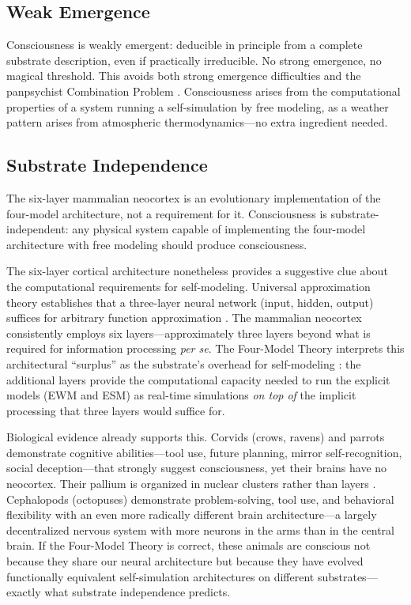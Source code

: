 \documentclass[12pt]{article}
\begin{document}
\subsection{Weak Emergence}

Consciousness is weakly emergent: deducible in principle from a complete substrate description, even if practically irreducible. No strong emergence, no magical threshold. This avoids both strong emergence difficulties \citep{Kim1993} and the panpsychist Combination Problem \citep{Chalmers2016}. Consciousness arises from the computational properties of a system running a self-simulation by free modeling, as a weather pattern arises from atmospheric thermodynamics---\hspace{0pt}no extra ingredient needed.


\subsection{Substrate Independence}

The six-layer mammalian neocortex is an evolutionary implementation of the four-model architecture, not a requirement for it. Consciousness is substrate-independent: any physical system capable of implementing the four-model architecture with free modeling should produce consciousness.

The six-layer cortical architecture nonetheless provides a suggestive clue about the computational requirements for self-modeling. Universal approximation theory establishes that a three-layer neural network (input, hidden, output) suffices for arbitrary function approximation \citep{Cybenko1989,Hornik1989}. The mammalian neocortex consistently employs six layers---\hspace{0pt}approximately three layers beyond what is required for information processing \emph{per se}. The Four-Model Theory interprets this architectural ``surplus'' as the substrate's overhead for self-modeling \citep{Gruber2015}: the additional layers provide the computational capacity needed to run the explicit models (EWM and ESM) as real-time simulations \emph{on top of} the implicit processing that three layers would suffice for.

Biological evidence already supports this. Corvids (crows, ravens) and parrots demonstrate cognitive abilities---\hspace{0pt}tool use, future planning, mirror self-recognition, social deception---\hspace{0pt}that strongly suggest consciousness, yet their brains have no neocortex. Their pallium is organized in nuclear clusters rather than layers \citep{Gunturkun2016}. Cephalopods (octopuses) demonstrate problem-solving, tool use, and behavioral flexibility with an even more radically different brain architecture---\hspace{0pt}a largely decentralized nervous system with more neurons in the arms than in the central brain. If the Four-Model Theory is correct, these animals are conscious not because they share our neural architecture but because they have evolved functionally equivalent self-simulation architectures on different substrates---\hspace{0pt}exactly what substrate independence predicts.
\end{document}
